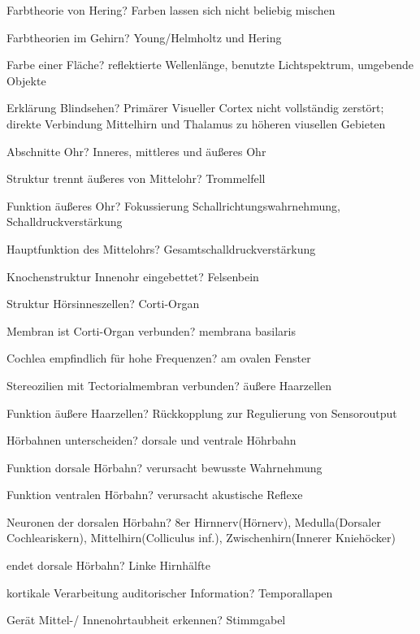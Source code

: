 \documentclass[a4paper]{article}
\begin{document}
\begin{multicols}{3}
  Farbtheorie von Hering? Farben lassen sich nicht beliebig mischen %

  Farbtheorien im Gehirn? Young/Helmholtz und Hering

  Farbe einer Fläche? reflektierte Wellenlänge, benutzte Lichtspektrum, umgebende Objekte

  Erklärung Blindsehen? Primärer Visueller Cortex nicht vollständig zerstört; direkte Verbindung Mittelhirn und Thalamus zu höheren viusellen Gebieten

  Abschnitte Ohr? Inneres, mittleres und äußeres Ohr

  Struktur trennt äußeres von Mittelohr? Trommelfell

  Funktion äußeres Ohr? Fokussierung Schallrichtungswahrnehmung, Schalldruckverstärkung

  Hauptfunktion des Mittelohrs? Gesamtschalldruckverstärkung


  Knochenstruktur Innenohr eingebettet? Felsenbein

  Struktur Hörsinneszellen? Corti-Organ

  Membran ist Corti-Organ verbunden? membrana basilaris

  Cochlea empfindlich für hohe Frequenzen? am ovalen Fenster

  Stereozilien mit Tectorialmembran verbunden? äußere Haarzellen

  Funktion äußere Haarzellen? Rückkopplung zur Regulierung von Sensoroutput

  Hörbahnen unterscheiden? dorsale und ventrale Höhrbahn

  Funktion dorsale Hörbahn? verursacht bewusste Wahrnehmung

  Funktion ventralen Hörbahn? verursacht akustische Reflexe

  Neuronen der dorsalen Hörbahn? 8er Hirnnerv(Hörnerv), Medulla(Dorsaler Cochleariskern), Mittelhirn(Colliculus inf.), Zwischenhirn(Innerer Kniehöcker)

  endet dorsale Hörbahn? Linke Hirnhälfte

  kortikale Verarbeitung auditorischer Information? Temporallapen

  Gerät Mittel-/ Innenohrtaubheit erkennen? Stimmgabel


\end{multicols}
\end{document}
